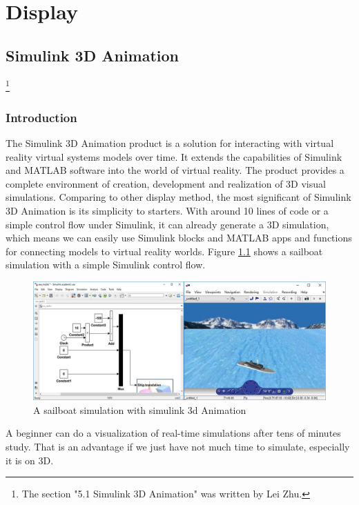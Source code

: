 \documentclass[a4paper]{report}
\begin{document}
\chapter{Display} \label{section:display}

\section{Simulink 3D Animation}\footnote{The section "5.1 Simulink 3D Animation" was written by Lei Zhu.}
\subsection{Introduction}
The Simulink 3D Animation product is a solution for interacting with virtual reality virtual systems models over time. It extends the capabilities of Simulink and MATLAB software into the world of virtual reality. The product provides a complete environment of creation, development and realization of 3D visual simulations. Comparing to other display method, the most significant of Simulink 3D Animation is its simplicity to starters. With around 10 lines of code or a simple control flow under Simulink, it can already generate a 3D simulation, which means we can easily use Simulink blocks and MATLAB apps and functions for connecting models to virtual reality worlds. Figure \ref{fig:simu3dan} shows a sailboat simulation with a simple Simulink control flow.\\

\begin{figure}[H]
  \centering
  \includegraphics[scale = 0.5]{image/simu3dan.jpg}
  \caption{A sailboat simulation with simulink 3d Animation}
  \label{fig:simu3dan}
\end{figure}

A beginner can do a visualization of real-time simulations after tens of minutes study. That is an advantage if we just have not much time to simulate, especially it is on 3D.\\
\end{document}

